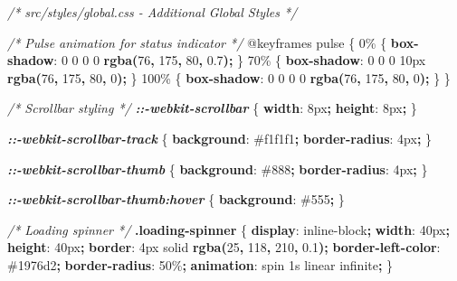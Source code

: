 \documentclass[
]{article}
\newenvironment{Shaded}{\begin{snugshade}}{\end{snugshade}}
\newcommand{\CommentTok}[1]{\textcolor[rgb]{0.56,0.35,0.01}{\textit{#1}}}
\newcommand{\ConstantTok}[1]{\textcolor[rgb]{0.56,0.35,0.01}{#1}}
\newcommand{\DataTypeTok}[1]{\textcolor[rgb]{0.13,0.29,0.53}{#1}}
\newcommand{\DecValTok}[1]{\textcolor[rgb]{0.00,0.00,0.81}{#1}}
\newcommand{\FunctionTok}[1]{\textcolor[rgb]{0.13,0.29,0.53}{\textbf{#1}}}
\newcommand{\ImportTok}[1]{#1}
\newcommand{\InformationTok}[1]{\textcolor[rgb]{0.56,0.35,0.01}{\textbf{\textit{#1}}}}
\newcommand{\KeywordTok}[1]{\textcolor[rgb]{0.13,0.29,0.53}{\textbf{#1}}}
\newcommand{\NormalTok}[1]{#1}
\newcommand{\OperatorTok}[1]{\textcolor[rgb]{0.81,0.36,0.00}{\textbf{#1}}}
\begin{document}
\begin{Shaded}
\begin{Highlighting}[]
\CommentTok{/* src/styles/global.css {-} Additional Global Styles */}

\CommentTok{/* Pulse animation for status indicator */}
\ImportTok{@keyframes}\NormalTok{ pulse \{}
\NormalTok{  0\% \{}
    \KeywordTok{box{-}shadow}\NormalTok{: }\DecValTok{0} \DecValTok{0} \DecValTok{0} \DecValTok{0} \FunctionTok{rgba(}\DecValTok{76}\OperatorTok{,} \DecValTok{175}\OperatorTok{,} \DecValTok{80}\OperatorTok{,} \DecValTok{0.7}\FunctionTok{)}\OperatorTok{;}
\NormalTok{  \}}
\NormalTok{  70\% \{}
    \KeywordTok{box{-}shadow}\NormalTok{: }\DecValTok{0} \DecValTok{0} \DecValTok{0} \DecValTok{10}\DataTypeTok{px} \FunctionTok{rgba(}\DecValTok{76}\OperatorTok{,} \DecValTok{175}\OperatorTok{,} \DecValTok{80}\OperatorTok{,} \DecValTok{0}\FunctionTok{)}\OperatorTok{;}
\NormalTok{  \}}
\NormalTok{  100\% \{}
    \KeywordTok{box{-}shadow}\NormalTok{: }\DecValTok{0} \DecValTok{0} \DecValTok{0} \DecValTok{0} \FunctionTok{rgba(}\DecValTok{76}\OperatorTok{,} \DecValTok{175}\OperatorTok{,} \DecValTok{80}\OperatorTok{,} \DecValTok{0}\FunctionTok{)}\OperatorTok{;}
\NormalTok{  \}}
\NormalTok{\}}

\CommentTok{/* Scrollbar styling */}
\InformationTok{::{-}webkit{-}scrollbar}\NormalTok{ \{}
  \KeywordTok{width}\NormalTok{: }\DecValTok{8}\DataTypeTok{px}\OperatorTok{;}
  \KeywordTok{height}\NormalTok{: }\DecValTok{8}\DataTypeTok{px}\OperatorTok{;}
\NormalTok{\}}

\InformationTok{::{-}webkit{-}scrollbar{-}track}\NormalTok{ \{}
  \KeywordTok{background}\NormalTok{: }\ConstantTok{\#f1f1f1}\OperatorTok{;}
  \KeywordTok{border{-}radius}\NormalTok{: }\DecValTok{4}\DataTypeTok{px}\OperatorTok{;}
\NormalTok{\}}

\InformationTok{::{-}webkit{-}scrollbar{-}thumb}\NormalTok{ \{}
  \KeywordTok{background}\NormalTok{: }\ConstantTok{\#888}\OperatorTok{;}
  \KeywordTok{border{-}radius}\NormalTok{: }\DecValTok{4}\DataTypeTok{px}\OperatorTok{;}
\NormalTok{\}}

\InformationTok{::{-}webkit{-}scrollbar{-}thumb:hover}\NormalTok{ \{}
  \KeywordTok{background}\NormalTok{: }\ConstantTok{\#555}\OperatorTok{;}
\NormalTok{\}}

\CommentTok{/* Loading spinner */}
\FunctionTok{.loading{-}spinner}\NormalTok{ \{}
  \KeywordTok{display}\NormalTok{: }\DecValTok{inline{-}block}\OperatorTok{;}
  \KeywordTok{width}\NormalTok{: }\DecValTok{40}\DataTypeTok{px}\OperatorTok{;}
  \KeywordTok{height}\NormalTok{: }\DecValTok{40}\DataTypeTok{px}\OperatorTok{;}
  \KeywordTok{border}\NormalTok{: }\DecValTok{4}\DataTypeTok{px} \DecValTok{solid} \FunctionTok{rgba(}\DecValTok{25}\OperatorTok{,} \DecValTok{118}\OperatorTok{,} \DecValTok{210}\OperatorTok{,} \DecValTok{0.1}\FunctionTok{)}\OperatorTok{;}
  \KeywordTok{border{-}left{-}color}\NormalTok{: }\ConstantTok{\#1976d2}\OperatorTok{;}
  \KeywordTok{border{-}radius}\NormalTok{: }\DecValTok{50}\DataTypeTok{\%}\OperatorTok{;}
  \KeywordTok{animation}\NormalTok{: spin }\DecValTok{1}\DataTypeTok{s} \DecValTok{linear} \DecValTok{infinite}\OperatorTok{;}
\NormalTok{\}}


\end{Highlighting}
\end{Shaded}
\end{document}
